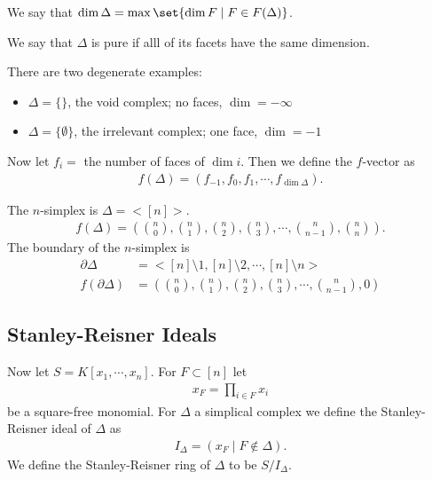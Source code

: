\begin{definition}
    We say that $\dim \Delta  = \max \set{ \dim F \mid F \in F( \Delta) } $.
\end{definition}

\begin{definition}
    We say that $\Delta$ is pure if alll of its facets have the same dimension.
\end{definition}

\begin{remark}
    There are two degenerate examples:
    \begin{itemize}
        \item $\Delta = \{ \} $, the void complex;  no faces, $\dim = - \infty$
        \item $\Delta = \{ \emptyset \} $, the irrelevant complex; one face, $\dim = -1$
    \end{itemize}
\end{remark}

\begin{definition}
    Now let $f_i =$ the number of faces of $\dim i$. Then we define the $f$-vector as
    \begin{align*}
        f(\Delta ) = (f_{-1}, f_0 , f_1, \cdots , f_{\dim \Delta}).
    \end{align*}
\end{definition}

\begin{example}
    The $n$-simplex is $\Delta = < [n] >$.
    \begin{align*}
        f(\Delta ) =  \left( \binom{n}{0},\binom{n}{1}, \binom{n}{2}, \binom{n}{3 } , \cdots, \binom{n}{n-1}, \binom{n}{n} \right).
    \end{align*}
    The boundary of the $n$-simplex is
    \begin{align*}
        \partial \Delta &= < [n] \setminus 1, [n] \setminus 2 , \cdots  , [n] \setminus n>\\
        f(\partial \Delta ) &= \left( \binom{n}{0},\binom{n}{1}, \binom{n}{2}, \binom{n}{3 } , \cdots, \binom{n}{n-1}, 0 \right)
    \end{align*}
\end{example}

\subsection{Stanley-Reisner Ideals}

\begin{definition}
Now let $S = K [ x_1, \cdots, x_n]$. For $F \subset [n]$ let
\begin{align*}
    x_F = \prod_{i \in F} x_i
\end{align*}
be a square-free monomial. For $\Delta $ a simplical complex we define the Stanley-Reisner ideal of $\Delta$ as
\begin{align*}
    I_\Delta = ( x_F \mid F \notin \Delta ).
\end{align*}
We define the Stanley-Reisner ring of $\Delta$ to be $S / I_\Delta$.
\end{definition}

